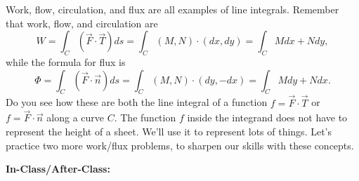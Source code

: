 Work, flow, circulation, and flux are all examples of line integrals.  Remember that work, flow, and circulation are 
$$W=\int_C (\vec F\cdot \vec T)ds =\int_C (M,N)\cdot(dx,dy) =  \int_C Mdx+Ndy,$$
while the formula for flux is
$$\Phi=\int_C (\vec F\cdot \vec n)ds =\int_C (M,N)\cdot(dy,-dx) =  \int_C Mdy+Ndx.$$
Do you see how these are both the line integral of a function $f = \vec F\cdot \vec T$ or $f=\vec F\cdot \vec n$ along a curve $C$.  The function $f$ inside the integrand does not have to represent the height of a sheet. We'll use it to represent lots of things.  Let's practice two more work/flux problems, to sharpen our skills with these concepts. 

\newpage

\large
\textbf{In-Class/After-Class:\\}
\normalsize

